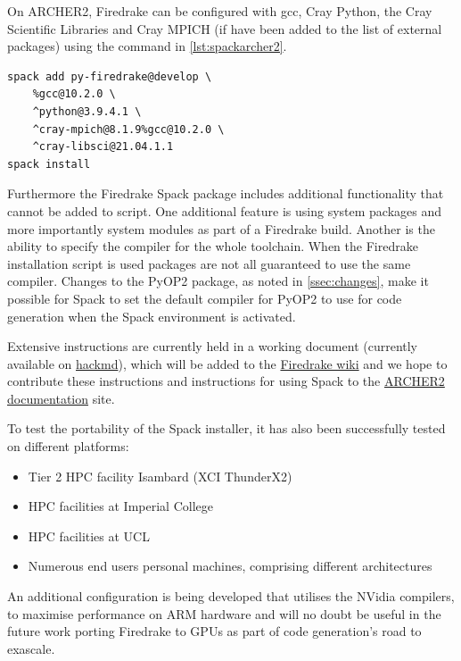 \documentclass[a4paper,11pt]{article}
\begin{document}
On ARCHER2, Firedrake can be configured with gcc, Cray Python, the Cray Scientific Libraries and Cray MPICH (if have been added to the list of external packages) using the command in \cref{lst:spackarcher2}.
\begin{lstlisting}[float,caption={Spack configuration for ARCHER2 using GCC, Cray Python, Cray MPICH and Cray scientific libraries},label={lst:spackarcher2}]
spack add py-firedrake@develop \
    %gcc@10.2.0 \
    ^python@3.9.4.1 \
    ^cray-mpich@8.1.9%gcc@10.2.0 \
    ^cray-libsci@21.04.1.1
spack install
\end{lstlisting}
Furthermore the Firedrake Spack package includes additional functionality that cannot be added to script.
One additional feature is using system packages and more importantly system modules as part of a Firedrake build.
Another is the ability to specify the compiler for the whole toolchain.
When the Firedrake installation script is used packages are not all guaranteed to use the same compiler.
Changes to the PyOP2 package, as noted in \cref{ssec:changes}, make it possible for Spack to set the default compiler for PyOP2 to use for code generation when the Spack environment is activated.

Extensive instructions are currently held in a working document (currently available on \href{https://hackmd.io/Sg3fYXuCTl61d_LAg4QnMw}{hackmd}), which will be added to the \href{https://github.com/firedrakeproject/firedrake/wiki}{Firedrake wiki}\cite{firedrakewiki} and we hope to contribute these instructions and instructions for using Spack to the \href{https://docs.archer2.ac.uk/}{ARCHER2 documentation}\cite{archer2docs} site.

To test the portability of the Spack installer, it has also been successfully tested on different platforms:
\begin{itemize}[topsep=2pt, partopsep=0pt, itemsep=1pt, parsep=1pt]
	\item Tier 2 HPC facility Isambard (XCI ThunderX2)
	\item HPC facilities at Imperial College
	\item HPC facilities at UCL
	\item Numerous end users personal machines, comprising different architectures
\end{itemize} 
An additional configuration is being developed that utilises the NVidia compilers, to maximise performance on ARM hardware and will no doubt be useful in the future work porting Firedrake to GPUs as part of code generation's road to exascale.
\end{document}
